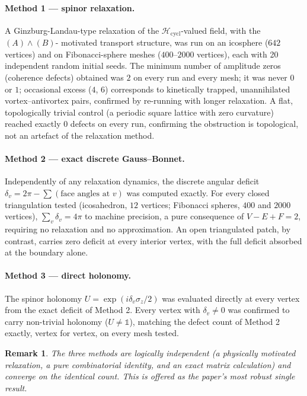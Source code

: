 \documentclass[12pt,a4paper]{article}
\newtheorem{remark}[theorem]{Remark}
\newcommand{\sig}{\sigma}
\newcommand{\Hcycl}{\mathcal{H}_{\mathrm{cycl}}}
\begin{document}
\paragraph{Method 1 --- spinor relaxation.} A Ginzburg-Landau-type
relaxation of the $\Hcycl$-valued field, with the $(A)\wedge(B)$-
motivated transport structure, was run on an icosphere ($642$
vertices) and on Fibonacci-sphere meshes ($400$--$2000$ vertices),
each with 20 independent random initial seeds. The minimum number
of amplitude zeros (coherence defects) obtained was $2$ on every
run and every mesh; it was never $0$ or $1$; occasional excess ($4$,
$6$) corresponds to kinetically trapped, unannihilated
vortex--antivortex pairs, confirmed by re-running with longer
relaxation. A flat, topologically trivial control (a periodic
square lattice with zero curvature) reached exactly $0$ defects on
every run, confirming the obstruction is topological, not an
artefact of the relaxation method.

\paragraph{Method 2 --- exact discrete Gauss--Bonnet.} Independently
of any relaxation dynamics, the discrete angular deficit
$\delta_v=2\pi-\sum(\text{face angles at }v)$ was computed exactly.
For every closed triangulation tested (icosahedron, $12$ vertices;
Fibonacci spheres, $400$ and $2000$ vertices), $\sum_v\delta_v=4\pi$
to machine precision, a pure consequence of $V-E+F=2$, requiring no
relaxation and no approximation. An open triangulated patch, by
contrast, carries zero deficit at every interior vertex, with the
full deficit absorbed at the boundary alone.

\paragraph{Method 3 --- direct holonomy.} The spinor holonomy
$U=\exp(i\delta_v\sig_z/2)$ was evaluated directly at every vertex
from the exact deficit of Method 2. Every vertex with $\delta_v\neq0$
was confirmed to carry non-trivial holonomy ($U\neq\mathbb{1}$),
matching the defect count of Method 2 exactly, vertex for vertex,
on every mesh tested.

\begin{remark}
The three methods are logically independent (a physically motivated
relaxation, a pure combinatorial identity, and an exact matrix
calculation) and converge on the identical count. This is offered
as the paper's most robust single result.
\end{remark}
\end{document}
